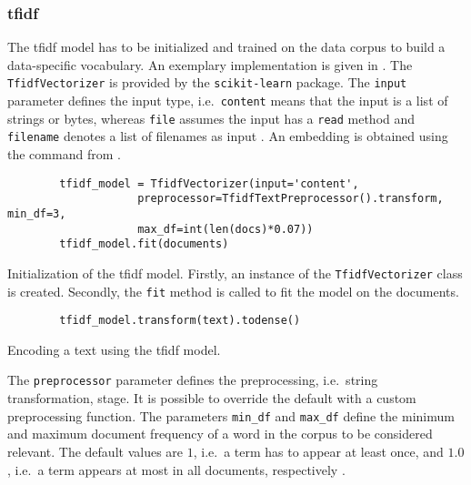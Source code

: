 \subsubsection*{\ac{tfidf}}\label{subsubsec:impl-tfidf}

The \ac{tfidf} model has to be initialized and trained on the data corpus to build a data-specific vocabulary.
An exemplary implementation is given in .
The \texttt{TfidfVectorizer} is provided by the \texttt{scikit-learn} package.
The \texttt{input} parameter defines the input type, i.e.\ \texttt{content} means that the input is a list of strings or bytes, 
whereas \texttt{file} assumes the input has a \texttt{read} method and \texttt{filename} denotes a list of filenames as input \cite{tfidf-scikit-learn}.
An embedding is obtained using the command from .

\begin{listing}[htp]
    \begin{verbatim}
        tfidf_model = TfidfVectorizer(input='content', 
                    preprocessor=TfidfTextPreprocessor().transform, min_df=3, 
                    max_df=int(len(docs)*0.07))
        tfidf_model.fit(documents)
    \end{verbatim}
    \caption[Initialization of the \ac{tfidf} model]{Initialization of the \ac{tfidf} model.
    Firstly, an instance of the \texttt{TfidfVectorizer} class is created.
    Secondly, the \texttt{fit} method is called to fit the model on the documents.
    }
    \label{lst:impl-tfidf}
\end{listing}

\begin{listing}[htp]
    \begin{verbatim}
        tfidf_model.transform(text).todense()
    \end{verbatim}
    \caption[Encoding a text using the \ac{tfidf} model]{Encoding a text using the \ac{tfidf} model.
    }
    \label{lst:encode-tfidf}
\end{listing}

The \texttt{preprocessor} parameter defines the preprocessing, i.e.\ string transformation, stage.
It is possible to override the default with a custom preprocessing function.
The parameters \texttt{min\_df} and \texttt{max\_df} define the minimum and maximum document frequency of a word in the corpus to be considered relevant.
The default values are $1$, i.e.\ a term has to appear at least once, and $1.0$, i.e.\ a term appears at most in all documents, respectively \cite{tfidf-scikit-learn}.

